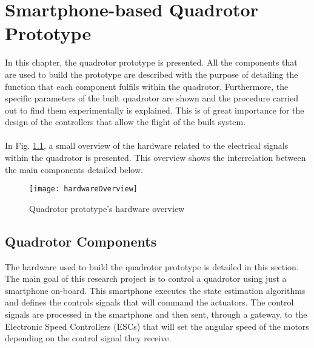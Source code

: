 \chapter{Smartphone-based Quadrotor Prototype} \label{ch:prototype}
In this chapter, the quadrotor prototype is presented. All the components that are used to build the prototype are described with the purpose of detailing the function that each component fulfils within the quadrotor. Furthermore, the specific parameters of the built quadrotor are shown and the procedure carried out to find them experimentally is explained. This is of great importance for the design of the controllers that allow the flight of the built system.
\\\\
In Fig. \ref{fig:hardwareoverview}, a small overview of the hardware related to the electrical signals within the quadrotor is presented. This overview shows the interrelation between the main components detailed below.
\begin{figure}[h]
	\begin{center}
		\texttt{[image: hardwareOverview]}    
		\caption{Quadrotor prototype's hardware overview} 
		\label{fig:hardwareoverview}
	\end{center}
\end{figure}

\section{Quadrotor Components}
\label{sec:components}
The hardware used to build the quadrotor prototype is detailed in this section. The main goal of this research project is to control a quadrotor using just a smartphone on-board. This smartphone executes the state estimation algorithms and defines the controls signals that will command the actuators. The control signals are processed in the smartphone and then sent, through a gateway, to the Electronic Speed Controllers (ESCs) that will set the angular speed of the motors depending on the control signal they receive.
